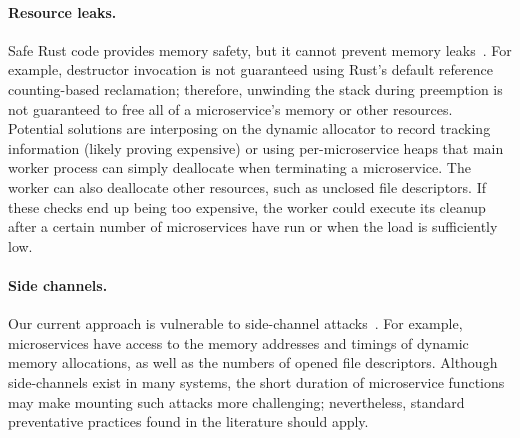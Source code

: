 \paragraph{Resource leaks.}
Safe Rust code provides memory safety, but it cannot prevent memory
leaks~\cite{www-rustlang-nu}.  For example, destructor invocation is not
guaranteed using Rust's default reference counting-based reclamation; therefore,
unwinding the stack during preemption is not guaranteed to free all of a
microservice's memory or other resources.  Potential solutions are interposing
on the dynamic allocator to record tracking information (likely proving
expensive) or using per-microservice heaps that main worker process can simply
deallocate when terminating a microservice.  The worker can also deallocate
other resources, such as unclosed file descriptors.  If these checks end up
being too expensive, the worker could execute its cleanup after a certain number
of microservices have run or when the load is sufficiently low.

\paragraph{Side channels.}
Our current approach is vulnerable to side-channel
attacks~\cite{Lipp2018,Kocher2018}.  For example, microservices have access to
the memory addresses and timings of dynamic memory allocations, as well as the
numbers of opened file descriptors.  Although side-channels exist in many
systems, the short duration of microservice functions may
make mounting such attacks more challenging; nevertheless, standard
preventative practices found in the literature should apply.

%

